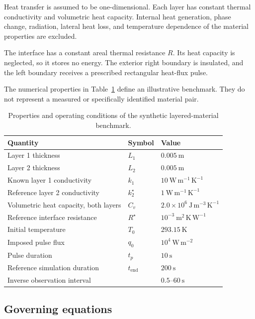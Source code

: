 \documentclass[11pt,a4paper]{article}
\begin{document}
Heat transfer is assumed to be one-dimensional.
Each layer has constant thermal conductivity and volumetric
heat capacity. Internal heat generation, phase change,
radiation, lateral heat loss, and temperature dependence of
the material properties are excluded.

The interface has a constant areal thermal resistance $R$.
Its heat capacity is neglected, so it stores no energy.
The exterior right boundary is insulated, and the left
boundary receives a prescribed rectangular heat-flux pulse.

The numerical properties in Table~\ref{tab:benchmark} define
an illustrative benchmark. They do not represent a measured
or specifically identified material pair.

\begin{table}[htbp]
\centering
\caption{Properties and operating conditions of the
synthetic layered-material benchmark.}
\label{tab:benchmark}
\begin{tabular}{lll}
\toprule
Quantity & Symbol & Value \\
\midrule
Layer 1 thickness & $L_1$ & $0.005~\mathrm{m}$ \\
Layer 2 thickness & $L_2$ & $0.005~\mathrm{m}$ \\
Known layer 1 conductivity & $k_1$
  & $10~\mathrm{W\,m^{-1}\,K^{-1}}$ \\
Reference layer 2 conductivity & $k_2^\star$
  & $1~\mathrm{W\,m^{-1}\,K^{-1}}$ \\
Volumetric heat capacity, both layers & $C_v$
  & $2.0\times10^6~\mathrm{J\,m^{-3}\,K^{-1}}$ \\
Reference interface resistance & $R^\star$
  & $10^{-3}~\mathrm{m^2\,K\,W^{-1}}$ \\
Initial temperature & $T_0$ & $293.15~\mathrm{K}$ \\
Imposed pulse flux & $q_0$ & $10^4~\mathrm{W\,m^{-2}}$ \\
Pulse duration & $t_p$ & $10~\mathrm{s}$ \\
Reference simulation duration & $t_{\mathrm{end}}$
  & $200~\mathrm{s}$ \\
Inverse observation interval & & $0.5$--$60~\mathrm{s}$ \\
\bottomrule
\end{tabular}
\end{table}

\subsection{Governing equations}
\end{document}
